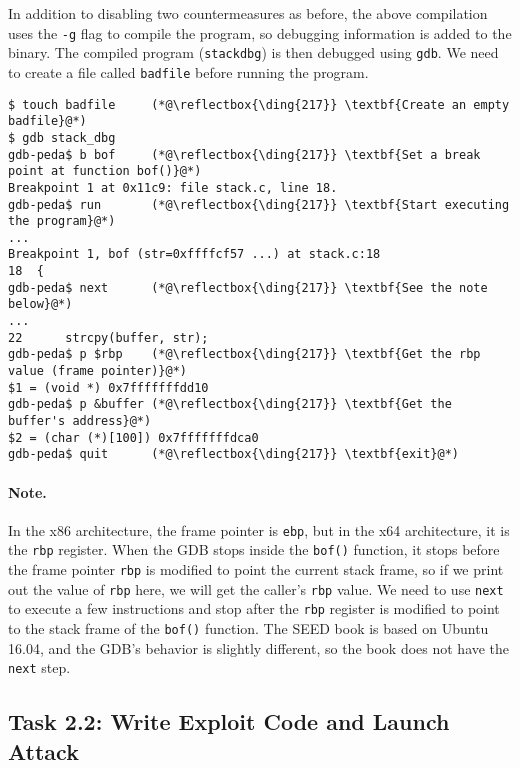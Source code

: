 In addition to disabling two countermeasures as before, the above compilation
uses the \texttt{-g} flag to compile the program, so debugging information
is added to the binary.  The compiled program (\texttt{stack\textunderscore dbg}) is
then debugged using \texttt{gdb}. We need to create a file called
\texttt{badfile} before running the program. 

\begin{lstlisting}
$ touch badfile     (*@\reflectbox{\ding{217}} \textbf{Create an empty badfile}@*)
$ gdb stack_dbg
gdb-peda$ b bof     (*@\reflectbox{\ding{217}} \textbf{Set a break point at function bof()}@*)
Breakpoint 1 at 0x11c9: file stack.c, line 18.
gdb-peda$ run       (*@\reflectbox{\ding{217}} \textbf{Start executing the program}@*)
...
Breakpoint 1, bof (str=0xffffcf57 ...) at stack.c:18
18  {
gdb-peda$ next      (*@\reflectbox{\ding{217}} \textbf{See the note below}@*)
...
22	    strcpy(buffer, str);
gdb-peda$ p $rbp    (*@\reflectbox{\ding{217}} \textbf{Get the rbp value (frame pointer)}@*)
$1 = (void *) 0x7fffffffdd10
gdb-peda$ p &buffer (*@\reflectbox{\ding{217}} \textbf{Get the buffer's address}@*)
$2 = (char (*)[100]) 0x7fffffffdca0
gdb-peda$ quit      (*@\reflectbox{\ding{217}} \textbf{exit}@*)
\end{lstlisting}


\paragraph{Note.} 
In the x86 architecture,
the frame pointer is \texttt{ebp}, but in the x64 architecture,
it is the \texttt{rbp} register. 
When the GDB stops inside the \texttt{bof()} function, it 
stops before the frame pointer \texttt{rbp} is modified
to point the current stack frame, so 
if we print out the value of 
\texttt{rbp} here, we will get the caller's \texttt{rbp} value. 
We need to use 
\texttt{next} to execute a few instructions and stop 
after the \texttt{rbp} register is modified to point to the stack
frame of the \texttt{bof()} function. 
The SEED book is based on Ubuntu 16.04, and the GDB's behavior is slightly
different, so the book does not have the \texttt{next} step. 


\subsection{Task 2.2: Write Exploit Code and Launch Attack} 

